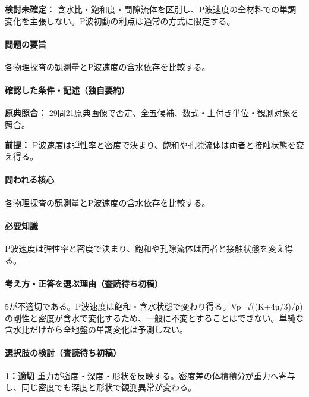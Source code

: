 \par\textbf{検討未確定：} 含水比・飽和度・間隙流体を区別し、P波速度の全材料での単調変化を主張しない。P波初動の利点は通常の方式に限定する。

\paragraph{問題の要旨} 各物理探査の観測量とP波速度の含水依存を比較する。

\paragraph{確認した条件・記述（独自要約）}\mbox{}\par

\noindent\textbf{原典照合：} 29問21原典画像で否定、全五候補、数式・上付き単位・観測対象を照合。\par

\noindent\textbf{前提：} P波速度は弾性率と密度で決まり、飽和や孔隙流体は両者と接触状態を変え得る。\par

\paragraph{問われる核心} 各物理探査の観測量とP波速度の含水依存を比較する。

\paragraph{必要知識} P波速度は弾性率と密度で決まり、飽和や孔隙流体は両者と接触状態を変え得る。

\paragraph{考え方・正答を選ぶ理由（査読待ち初稿）} 5が不適切である。P波速度は飽和・含水状態で変わり得る。Vp=√((K+4µ/3)/ρ)の剛性と密度が含水で変化するため、一般に不変とすることはできない。単純な含水比だけから全地盤の単調変化は予測しない。

\paragraph{選択肢の検討（査読待ち初稿）}\mbox{}\par

\noindent\textbf{1：適切} 重力が密度・深度・形状を反映する。密度差の体積積分が重力へ寄与し、同じ密度でも深度と形状で観測異常が変わる。\par

